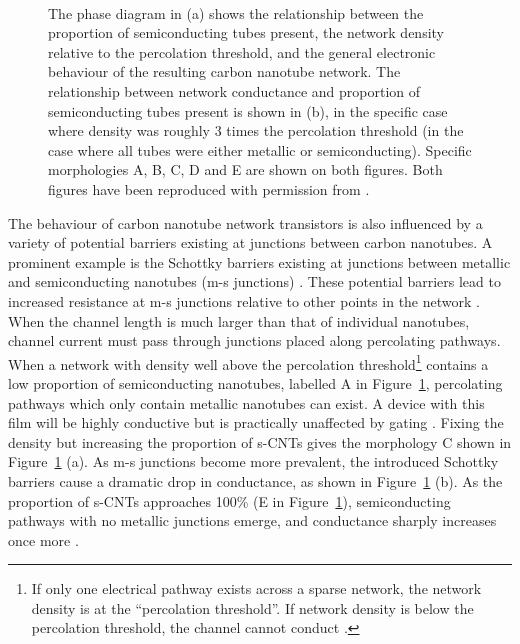 \documentclass[
  a4paper,
]{scrbook}
\begin{document}
\begin{figure}
\begin{minipage}[t]{0.40\linewidth}
{}

\end{minipage}%
%
\begin{minipage}[t]{0.01\linewidth}

{\centering 

~

}

\end{minipage}%

\caption[Figures showing the relationship between the proportion of
semiconducting tubes present, the network density relative to the
percolation threshold, and the general electronic behaviour of the
resulting carbon nanotube network.]{\label{fig-m-s-junctions}The phase
diagram in (a) shows the relationship between the proportion of
semiconducting tubes present, the network density relative to the
percolation threshold, and the general electronic behaviour of the
resulting carbon nanotube network. The relationship between network
conductance and proportion of semiconducting tubes present is shown in
(b), in the specific case where density was roughly 3 times the
percolation threshold (in the case where all tubes were either metallic
or semiconducting). Specific morphologies A, B, C, D and E are shown on
both figures. Both figures have been reproduced with permission from
\autocite{Topinka2009}.}

\end{figure}

The behaviour of carbon nanotube network transistors is also influenced
by a variety of potential barriers existing at junctions between carbon
nanotubes. A prominent example is the Schottky barriers existing at
junctions between metallic and semiconducting nanotubes (m-s junctions)
\autocite{Fuhrer2000,Topinka2009,Murugathas2019}. These potential
barriers lead to increased resistance at m-s junctions relative to other
points in the network \autocite{Fuhrer2000,Jang2015}. When the channel
length is much larger than that of individual nanotubes, channel current
must pass through junctions placed along percolating pathways. When a
network with density well above the percolation threshold\footnote{If
  only one electrical pathway exists across a sparse network, the
  network density is at the ``percolation threshold''. If network
  density is below the percolation threshold, the channel cannot conduct
  \autocite{Hu2004,Topinka2009,Jang2015}.} contains a low proportion of
semiconducting nanotubes, labelled A in Figure~\ref{fig-m-s-junctions},
percolating pathways which only contain metallic nanotubes can exist. A
device with this film will be highly conductive but is practically
unaffected by gating \autocite{Fuhrer2000,Topinka2009}. Fixing the
density but increasing the proportion of s-CNTs gives the morphology C
shown in Figure~\ref{fig-m-s-junctions} (a). As m-s junctions become
more prevalent, the introduced Schottky barriers cause a dramatic drop
in conductance, as shown in Figure~\ref{fig-m-s-junctions} (b). As the
proportion of s-CNTs approaches 100\% (E in
Figure~\ref{fig-m-s-junctions}), semiconducting pathways with no
metallic junctions emerge, and conductance sharply increases once more
\autocite{Topinka2009}.
\end{document}
